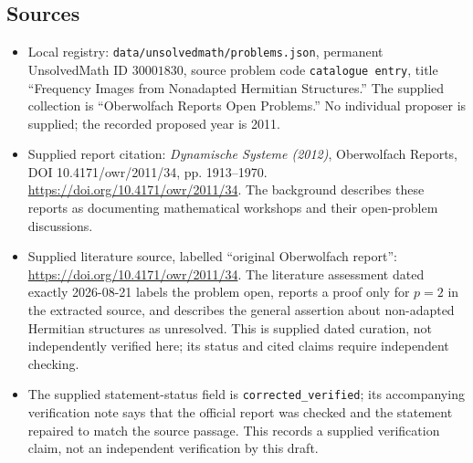 \documentclass[11pt]{article}
\begin{document}
\subsection{Sources}
\begin{itemize}
\item Local registry: \texttt{data/unsolvedmath/problems.json}, permanent UnsolvedMath ID \(30001830\), source problem code \texttt{catalogue entry}, title ``Frequency Images from Nonadapted Hermitian Structures.'' The supplied collection is ``Oberwolfach Reports Open Problems.'' No individual proposer is supplied; the recorded proposed year is 2011.
\item Supplied report citation: \emph{Dynamische Systeme (2012)}, Oberwolfach Reports, DOI 10.4171/owr/2011/34, pp. 1913--1970. \url{https://doi.org/10.4171/owr/2011/34}. The background describes these reports as documenting mathematical workshops and their open-problem discussions.
\item Supplied literature source, labelled ``original Oberwolfach report'': \url{https://doi.org/10.4171/owr/2011/34}. The literature assessment dated exactly 2026-08-21 labels the problem open, reports a proof only for \(p=2\) in the extracted source, and describes the general assertion about non-adapted Hermitian structures as unresolved. This is supplied dated curation, not independently verified here; its status and cited claims require independent checking.
\item The supplied statement-status field is \texttt{corrected\_verified}; its accompanying verification note says that the official report was checked and the statement repaired to match the source passage. This records a supplied verification claim, not an independent verification by this draft.
\end{itemize}
\end{document}

